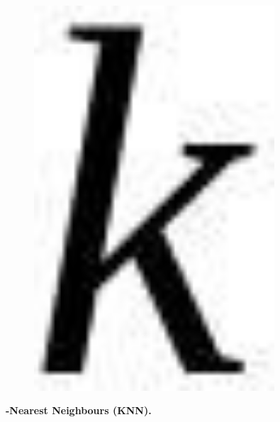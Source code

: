 \begin{figure}[H]
	\centering
	\includegraphics[width=0.8\textwidth]{assets/92}
	\caption*{}
\end{figure}{\bfseries -Nearest Neighbours (KNN).}
